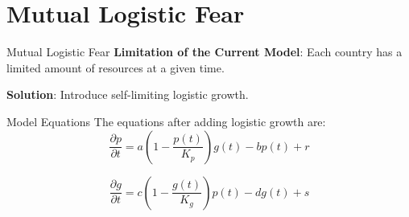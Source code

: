 \documentclass[11pt]{beamer}
\begin{document}
\section{Mutual Logistic Fear}
\begin{frame}{Mutual Logistic Fear}
    \textbf{Limitation of the Current Model}: Each country has a limited amount of resources at a given time.
\vspace{0.3cm}

    \textbf{Solution}: Introduce self-limiting logistic growth.
     
\vspace{0.3cm}
    \begin{block}{Model Equations}
        The equations after adding logistic growth are:
   \begin{equation}
        \dfrac{\partial p}{\partial t} = a \left (1-\frac{p(t)}{K_p} \right) g(t) - b p(t) + r
    \end{equation}

   \begin{equation}
        \dfrac{\partial g}{\partial t} = c \left (1-\frac{g(t)}{K_g} \right)  p(t) - d g(t) + s
    \end{equation}
    \end{block}









\end{frame}
\end{document}
